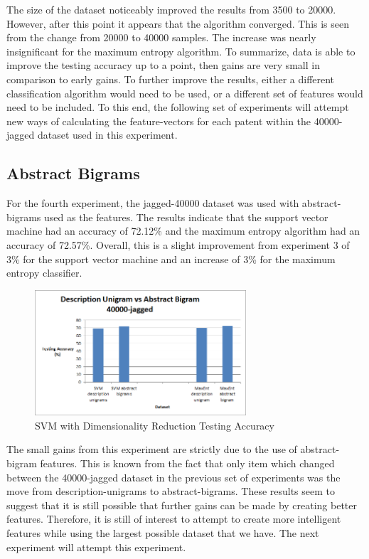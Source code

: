The size of the dataset noticeably improved the results from 3500 to 20000.  However, after this point it appears that the algorithm converged.  This is seen from the change from 20000 to 40000 samples.  The increase was nearly insignificant for the maximum entropy algorithm.  To summarize, data is able to improve the testing accuracy up to a point, then gains are very small in comparison to early gains.  To further improve the results, either a different classification algorithm would need to be used, or a different set of features would need to be included.  To this end, the following set of experiments will attempt new ways of calculating the feature-vectors for each patent within the 40000-jagged dataset used in this experiment.

\subsection{Abstract Bigrams}
For the fourth experiment, the jagged-40000 dataset was used with abstract-bigrams used as the features.  The results indicate that the support vector machine had an accuracy of 72.12\% and the maximum entropy algorithm had an accuracy of 72.57\%.  Overall, this is a slight improvement from experiment 3 of 3\% for the support vector machine and an increase of 3\% for the maximum entropy classifier.

\begin{figure}[!h]
\begin{center}
\caption{SVM with Dimensionality Reduction Testing Accuracy}
\includegraphics[width=0.7\textwidth]{Unigrams_vs_Bigrams.png}
\end{center}
\end{figure}

The small gains from this experiment are strictly due to the use of abstract-bigram features.  This is known from the fact that only item which changed between the 40000-jagged dataset in the previous set of experiments was the move from description-unigrams to abstract-bigrams.  These results seem to suggest that it is still possible that further gains can be made by creating better features. Therefore, it is still of interest to attempt to create more intelligent features while using the largest possible dataset that we have.  The next experiment will attempt this experiment. 

